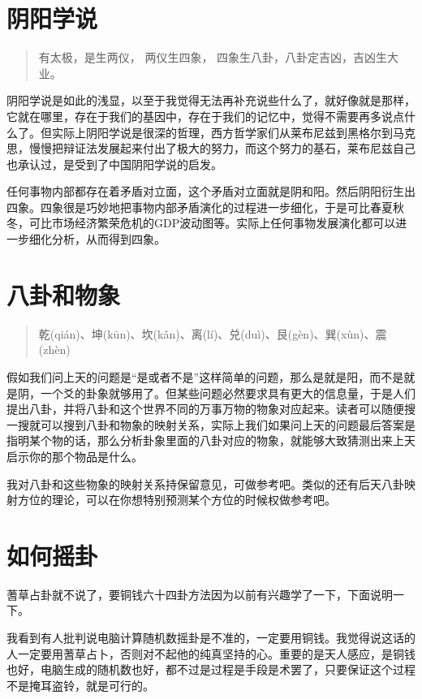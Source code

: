 \documentclass[12pt,oneside]{book}
\begin{document}
\section{阴阳学说}
\begin{quote}
有太极，是生两仪， 两仪生四象， 四象生八卦，八卦定吉凶，吉凶生大业。
\end{quote}


阴阳学说是如此的浅显，以至于我觉得无法再补充说些什么了，就好像就是那样，它就在哪里，存在于我们的基因中，存在于我们的记忆中，觉得不需要再多说点什么了。但实际上阴阳学说是很深的哲理，西方哲学家们从莱布尼兹到黑格尔到马克思，慢慢把辩证法发展起来付出了极大的努力，而这个努力的基石，莱布尼兹自己也承认过，是受到了中国阴阳学说的启发。

任何事物内部都存在着矛盾对立面，这个矛盾对立面就是阴和阳。然后阴阳衍生出四象。四象很是巧妙地把事物内部矛盾演化的过程进一步细化，于是可比春夏秋冬，可比市场经济繁荣危机的GDP波动图等。实际上任何事物发展演化都可以进一步细化分析，从而得到四象。

\section{八卦和物象}
\begin{quote}
乾(qián)、坤(kūn)、坎(kǎn)、离(lí)、兑(duì)、艮(gèn)、巽(xùn)、震(zhèn)
\end{quote}


假如我们问上天的问题是“是或者不是”这样简单的问题，那么是就是阳，而不是就是阴，一个爻的卦象就够用了。但某些问题必然要求具有更大的信息量，于是人们提出八卦，并将八卦和这个世界不同的万事万物的物象对应起来。读者可以随便搜一搜就可以搜到八卦和物象的映射关系，实际上我们如果问上天的问题最后答案是指明某个物的话，那么分析卦象里面的八卦对应的物象，就能够大致猜测出来上天启示你的那个物品是什么。

我对八卦和这些物象的映射关系持保留意见，可做参考吧。类似的还有后天八卦映射方位的理论，可以在你想特别预测某个方位的时候权做参考吧。



\section{如何摇卦}
蓍草占卦就不说了，要铜钱六十四卦方法因为以前有兴趣学了一下，下面说明一下。

我看到有人批判说电脑计算随机数摇卦是不准的，一定要用铜钱。我觉得说这话的人一定要用蓍草占卜，否则对不起他的纯真坚持的心。重要的是天人感应，是铜钱也好，电脑生成的随机数也好，都不过是过程是手段是术罢了，只要保证这个过程不是掩耳盗铃，就是可行的。
\end{document}
